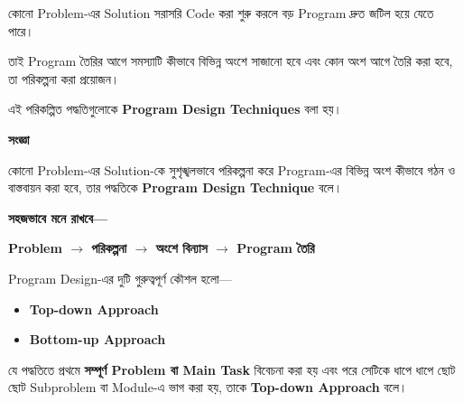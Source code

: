 
কোনো Problem-এর Solution সরাসরি Code করা শুরু করলে বড় Program
দ্রুত জটিল হয়ে যেতে পারে।

তাই Program তৈরির আগে সমস্যাটি কীভাবে বিভিন্ন অংশে সাজানো হবে
এবং কোন অংশ আগে তৈরি করা হবে, তা পরিকল্পনা করা প্রয়োজন।

এই পরিকল্পিত পদ্ধতিগুলোকে
\textbf{Program Design Techniques} বলা হয়।


\begin{definitionbox}

\textbf{\color{darkTeal}সংজ্ঞা}

কোনো Problem-এর Solution-কে সুশৃঙ্খলভাবে পরিকল্পনা করে
Program-এর বিভিন্ন অংশ কীভাবে গঠন ও বাস্তবায়ন করা হবে,
তার পদ্ধতিকে \textbf{Program Design Technique} বলে।

\end{definitionbox}

\textbf{সহজভাবে মনে রাখবে—}

\begin{center}

\textbf{
Problem
\(\longrightarrow\)
পরিকল্পনা
\(\longrightarrow\)
অংশে বিন্যাস
\(\longrightarrow\)
Program তৈরি
}

\end{center}

Program Design-এর দুটি গুরুত্বপূর্ণ কৌশল হলো—

\begin{itemize}

\item \textbf{Top-down Approach}

\item \textbf{Bottom-up Approach}

\end{itemize}


\begin{definitionbox}

যে পদ্ধতিতে প্রথমে \textbf{সম্পূর্ণ Problem বা Main Task}
বিবেচনা করা হয় এবং পরে সেটিকে ধাপে ধাপে ছোট ছোট
Subproblem বা Module-এ ভাগ করা হয়, তাকে
\textbf{Top-down Approach} বলে।

\end{definitionbox}

